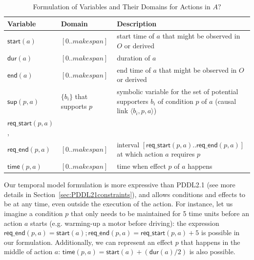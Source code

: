 \documentclass[10pt,journal,compsoc]{IEEEtran}
\newcommand{\tup}[1]{{\langle #1 \rangle}}
\newcommand{\dur}{\mathsf{dur}}    %
\newcommand{\start}{\mathsf{start}}%
\newcommand{\en}{\mathsf{end}}     %
\newcommand{\supp}{\mathsf{sup}}   %
\newcommand{\tim}{\mathsf{time}}   %
\newcommand{\reqs}{\mathsf{req\_{start}}} %
\newcommand{\reqe}{\mathsf{req\_{end}}}   %
\begin{document}
	\begin{table}
	\caption{Formulation of Variables and Their Domains for Actions in $A?$}
	\label{table:variables}
	\begin{center}
		\small
		\begin{tabular}{p{2.2cm}p{3.1cm}p{9.5cm}}
			Variable & Domain & Description \\
			
			\hline
			
			
			$\start(a)$ & $[0..makespan]$ & start time of $a$ that might be observed in $O$ or derived\\
			$\dur(a)$ & $[0..makespan]$ & duration of $a$\\
			$\en(a)$ & $[0..makespan]$ & end time of $a$ that might be observed in $O$ or derived \\
			
			
			$\supp(p,a)$ & $\{b_i\}$ that supports $p$ & symbolic variable for the set of potential supporters $b_i$ of condition $p$ of $a$ (causal link $\tup{b_i,p,a}$) \\
			
			$\reqs(p,a)$, \\
			$\reqe(p,a)$ & $[0..makespan]$ & interval $[\reqs(p,a)..\reqe(p,a)]$ at which action $a$ requires $p$ \\
			
			$\tim(p,a)$ & $[0..makespan]$ & time when effect $p$ of $a$ happens \\
			
			
			\hline
		\end{tabular}
		\normalsize
	\end{center}
\end{table}




Our temporal model formulation is more expressive than PDDL2.1 (see more details in Section~\ref{sec:PDDL21constraints}), and allows conditions and effects to be at any time, even outside the execution of the action. For instance, let us imagine a condition $p$ that only needs to be maintained for 5 time units before an action $a$ starts (e.g. warming-up a motor before driving): the expression $\reqe(p,a)=\start(a); \reqe(p,a) = \reqs(p,a)+5$ is possible in our formulation. Additionally, we can represent an effect $p$ that happens in the middle of action $a$: $\tim(p,a) = \start(a)+ (\dur(a) / 2)$ is also possible.
\end{document}
